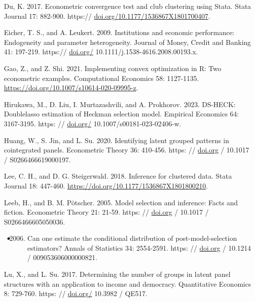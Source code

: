 \documentclass[10pt]{article}
\begin{document}
Du, K. 2017. Econometric convergence test and club clustering using Stata. Stata Journal 17: 882-900. https:// \href{http://doi.org/10.1177/1536867X1801700407}{doi.org/10.1177/1536867X1801700407}.

Eicher, T. S., and A. Leukert. 2009. Institutions and economic performance: Endogeneity and parameter heterogeneity. Journal of Money, Credit and Banking 41: 197-219. https:// \href{http://doi.org/}{doi.org/} 10.1111/j.1538-4616.2008.00193.x.

Gao, Z., and Z. Shi. 2021. Implementing convex optimization in R: Two econometric examples. Computational Economics 58: 1127-1135. \href{https://doi.org/10.1007/s10614-020-09995-z}{https://doi.org/10.1007/s10614-020-09995-z}.

Hirukawa, M., D. Liu, I. Murtazashvili, and A. Prokhorov. 2023. DS-HECK: Doublelasso estimation of Heckman selection model. Empirical Economics 64: 3167-3195. https: // \href{http://doi.org/}{doi.org/} 10.1007/s00181-023-02406-w.

Huang, W., S. Jin, and L. Su. 2020. Identifying latent grouped patterns in cointegrated panels. Econometric Theory 36: 410-456. https: // \href{http://doi.org}{doi.org} / 10.1017 / S0266466619000197.

Lee, C. H., and D. G. Steigerwald. 2018. Inference for clustered data. Stata Journal 18: 447-460. \href{https://doi.org/10.1177/1536867X1801800210}{https://doi.org/10.1177/1536867X1801800210}.

Leeb, H., and B. M. Pötscher. 2005. Model selection and inference: Facts and fiction. Econometric Theory 21: 21-59. https: // \href{http://doi.org}{doi.org} / 10.1017 / S0266466605050036.

\begin{itemize}
  \item 
  \begin{enumerate}
    \setcounter{enumii}{2005}
    \item Can one estimate the conditional distribution of post-model-selection estimators? Annals of Statistics 34: 2554-2591. https: // \href{http://doi.org}{doi.org} / 10.1214 / 009053606000000821.
  \end{enumerate}
\end{itemize}

Lu, X., and L. Su. 2017. Determining the number of groups in latent panel structures with an application to income and democracy. Quantitative Economics 8: 729-760. https: // \href{http://doi.org/}{doi.org/} 10.3982 / QE517.
\end{document}
